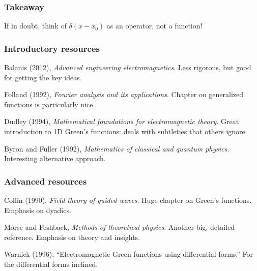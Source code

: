 \documentclass[12 pt, compress, handout, intlimits]{beamer}
\begin{document}
\begin{frame}[fragile]
    \frametitle{Takeaway}
    
    \begin{center}
        If in doubt, think of $ \delta(x - x_0) $ as an operator, not a function!
    \end{center}

\end{frame}


\begin{frame}[fragile]
    \frametitle{Introductory resources}
    Balanis (2012), \emph{Advanced engineering electromagnetics}. 
    Less rigorous, but good for getting the key ideas.

    Folland (1992), \emph{Fourier analysis and its applications}. 
    Chapter on generalized functions is particularly nice.

    Dudley (1994), \emph{Mathematical foundations for electromagnetic theory}.
    Great introduction to 1D Green's functions: deals with subtleties that others ignore.

    Byron and Fuller (1992), \emph{Mathematics of classical and quantum physics}.
    Interesting alternative approach.
    
\end{frame}

\note{}

\begin{frame}[fragile]
    \frametitle{Advanced resources}
    Collin (1990), \emph{Field theory of guided waves}. 
    Huge chapter on Green's functions. Emphasis on dyadics.

    Morse and Feshback, \emph{Methods of theoretical physics}.
    Another big, detailed reference. Emphasis on theory and insights.

    Warnick (1996), ``Electromagnetic Green functions using differential forms.''
    For the differential forms inclined.

\end{frame}    
\end{document}
